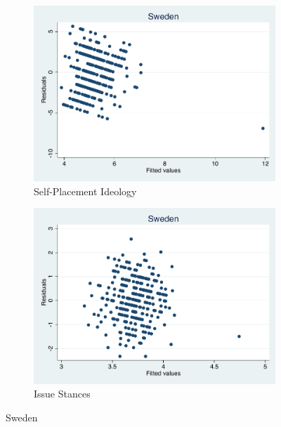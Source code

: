 \documentclass[12pt, titlepage]{article}
\begin{document}
\begin{figure}[H]
	\centering
	\begin{subfigure}[b]{0.475\textwidth}   
		\centering 
		\includegraphics[width=\textwidth]{Residuals/CountryIdeo/Sweden}
		\caption{Self-Placement Ideology}
	\end{subfigure}
	\hfill
	\begin{subfigure}[b]{0.475\textwidth}
		\centering 
		\includegraphics[width=\textwidth]{Residuals/CountryLib/Sweden}
		\caption{Issue Stances}
	\end{subfigure}
	\caption{Sweden}
	\label{Sweden}
\end{figure}
\end{document}
